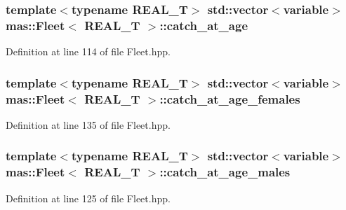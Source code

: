 \hypertarget{structmas_1_1_fleet_a2a423b2624e36ff6ff786b4bea5db2fe}{
\subsubsection[{catch\-\_\-at\-\_\-age}]{\setlength{\rightskip}{0pt plus 5cm}template$<$typename R\-E\-A\-L\-\_\-\-T$>$ std\-::vector$<${\bf variable}$>$ {\bf mas\-::\-Fleet}$<$ R\-E\-A\-L\-\_\-\-T $>$\-::catch\-\_\-at\-\_\-age}}\label{structmas_1_1_fleet_a2a423b2624e36ff6ff786b4bea5db2fe}


Definition at line 114 of file Fleet.\-hpp.

\hypertarget{structmas_1_1_fleet_a35939904cb0bd61c26516b2bf5753b2a}{
\subsubsection[{catch\-\_\-at\-\_\-age\-\_\-females}]{\setlength{\rightskip}{0pt plus 5cm}template$<$typename R\-E\-A\-L\-\_\-\-T$>$ std\-::vector$<${\bf variable}$>$ {\bf mas\-::\-Fleet}$<$ R\-E\-A\-L\-\_\-\-T $>$\-::catch\-\_\-at\-\_\-age\-\_\-females}}\label{structmas_1_1_fleet_a35939904cb0bd61c26516b2bf5753b2a}


Definition at line 135 of file Fleet.\-hpp.

\hypertarget{structmas_1_1_fleet_a384cc77fb80ba8d2d91722468839ea5d}{
\subsubsection[{catch\-\_\-at\-\_\-age\-\_\-males}]{\setlength{\rightskip}{0pt plus 5cm}template$<$typename R\-E\-A\-L\-\_\-\-T$>$ std\-::vector$<${\bf variable}$>$ {\bf mas\-::\-Fleet}$<$ R\-E\-A\-L\-\_\-\-T $>$\-::catch\-\_\-at\-\_\-age\-\_\-males}}\label{structmas_1_1_fleet_a384cc77fb80ba8d2d91722468839ea5d}


Definition at line 125 of file Fleet.\-hpp.

